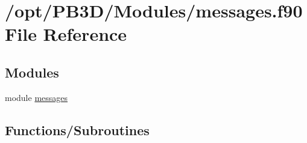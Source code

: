 \hypertarget{messages_8f90}{}\section{/opt/\+P\+B3\+D/\+Modules/messages.f90 File Reference}
\label{messages_8f90}
\subsection*{Modules}
\begin{DoxyCompactItemize}
\item 
module \hyperlink{namespacemessages}{messages}
\end{DoxyCompactItemize}
\subsection*{Functions/\+Subroutines}
